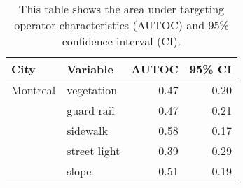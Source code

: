 \begin{table}[!htp]\centering
\caption{This table shows the area under targeting operator characteristics (AUTOC) and 95\% confidence interval (CI).}
\label{result:tab:autoc}
\scriptsize
\begin{tabular}{llrr}\toprule
City & Variable & AUTOC & 95\% CI \\\midrule
Montreal & vegetation & 0.47 & 0.20 \\
 & guard rail & 0.47 & 0.21 \\
 & sidewalk & 0.58 & 0.17 \\
 & street light & 0.39 & 0.29 \\
 & slope & 0.51 & 0.19 \\
\bottomrule
\end{tabular}
\end{table}
